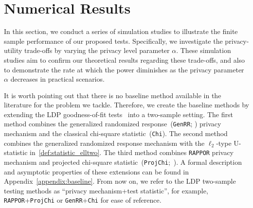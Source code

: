 \documentclass[twoside,11pt]{article}
\newcommand{\privacyParameter}{\alpha} %
\begin{document}











\section{Numerical Results}\label{section:simulation}
In this section, we conduct a series of simulation studies to illustrate the finite sample performance of our proposed tests. Specifically, we investigate the privacy-utility trade-offs by varying the privacy level parameter $\privacyParameter$. These simulation studies aim to confirm our theoretical results regarding these trade-offs, and also to demonstrate the rate at which the power diminishes as the privacy parameter $\privacyParameter$ decreases in practical scenarios. 


It is worth pointing out that there is no baseline method available in the literature for the problem we tackle.
Therefore, we create the baseline methods by extending the LDP goodness-of-fit tests~\citep{Gaboardi2018LDPChisq} into a two-sample setting.
The first method combines the generalized randomized response~(\texttt{GenRR}; \citep{Gaboardi2018LDPChisq}) privacy mechanism and the classical chi-square statistic~(\texttt{Chi}).
The second method combines the generalized randomized response mechanism with the $\ell_2$-type U-statistic in~\eqref{def:statistic_elltwo}.
The third method combines \texttt{RAPPOR} privacy mechanism and projected chi-square statistic~(\texttt{ProjChi};~\citep{Gaboardi2018LDPChisq}).
A formal description and asymptotic properties of these extensions can be found in Appendix~\ref{appendix:baseline}.
From now on, we refer to the LDP two-sample testing methods as ``privacy mechanism+test statistic'', for example, \texttt{RAPPOR}+\texttt{ProjChi} or \texttt{GenRR}+\texttt{Chi} for ease of reference.
\end{document}
